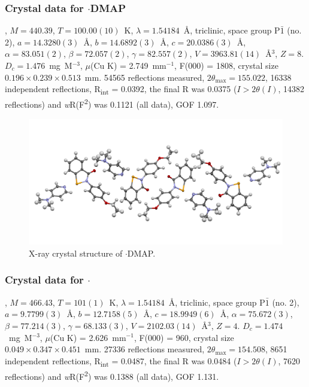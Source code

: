 \begin{refsection}
\subsubsection{Crystal data for \texorpdfstring{$ \cdot $DMAP}{C22 H23 N3 O2 Se}}
, $M=440.39$, $T=100.00(10)$~K, $\lambda=1.54184$~\AA, triclinic, space group P$\bar{1}$ (no. 2), $a = 14.3280(3)$~\AA, $b = 14.6892(3)$~\AA, $c = 20.0386(3)$~\AA, $\alpha = 83.051(2)$\degree, $\beta = 72.057(2)$\degree, $\gamma = 82.557(2)$\degree, $V = 3963.81(14)$~\AA$^{3}$, $Z = 8$. $D_{c}= 1.476$~mg~M$^{-3}$, $\mu$(Cu K\a) = 2.749~mm$^{-1}$, F(000) = 1808, crystal size $0.196 \times 0.239 \times 0.513$~mm. 54565 reflections measured, $2\theta_{\max}=155.022$\degree, 16338 independent reflections, R\textsubscript{int} = 0.0392, the final R was 0.0375 ($I > 2\theta(I)$, 14382 reflections) and \textit{w}R(F\textsuperscript{2}) was 0.1121 (all data), GOF 1.097.

\begin{figure}
  \includegraphics[width=0.6\linewidth]{Figures/ebs-4oet-dmap-xtal.pdf}
  \caption{X-ray crystal structure of \texorpdfstring{$ \cdot $DMAP}{C22 H23 N3 O2 Se}.}
\end{figure}

\subsubsection{Crystal data for \texorpdfstring{$ \cdot $}{C24 H25 N3 O2 Se}}
, $M=466.43$, $T=101(1)$~K, $\lambda=1.54184$~\AA, triclinic, space group P$\bar{1}$ (no. 2), $a = 9.7799(3)$~\AA, $b = 12.7158(5)$~\AA, $c = 18.9949(6)$~\AA, $\alpha = 75.672(3)$\degree, $\beta = 77.214(3)$\degree, $\gamma = 68.133(3)$\degree, $V = 2102.03(14)$~\AA$^{3}$, $Z = 4$. $D_{c}= 1.474$~mg~M$^{-3}$, $\mu$(Cu K\a) = 2.626~mm$^{-1}$, F(000) = 960, crystal size $0.049 \times 0.347 \times 0.451$~mm. 27336 reflections measured, $2\theta_{\max}=154.508$\degree, 8651 independent reflections, R\textsubscript{int} = 0.0487, the final R was 0.0484 ($I > 2\theta(I)$, 7620 reflections) and \textit{w}R(F\textsuperscript{2}) was 0.1388 (all data), GOF 1.131.


\end{refsection}
